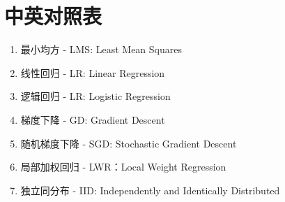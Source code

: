 \section{中英对照表}
\begin{enumerate}
	\item 最小均方 - LMS: Least Mean Squares
	\item 线性回归 - LR: Linear Regression
	\item 逻辑回归 - LR: Logistic Regression
	\item 梯度下降 - GD: Gradient Descent
	\item 随机梯度下降 - SGD: Stochastic Gradient Descent
	\item 局部加权回归 - LWR：Local Weight Regression
	\item 独立同分布 - IID: Independently and Identically Distributed
\end{enumerate}